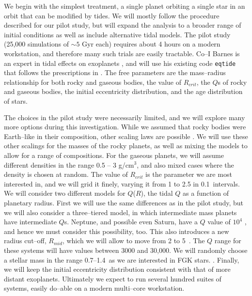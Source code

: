 \medskip
{\centerline{}}
\smallskip

We begin with the simplest treatment, a single planet orbiting a
single star in an orbit that can be modified by tides.  We will mostly
follow the procedure described for our pilot study, but will expand
the analysis to a broader range of initial conditions as well as
include alternative tidal models.  The pilot study (25,000 simulations
of $\sim 5$ Gyr each) requires about 4 hours on a modern workstation,
and therefore many such trials are easily tractable.  Co--I Barnes is
an expert in tidal effects on exoplanets
\citep{Barnes08,Jackson08,Barnes09,Barnes13}, and will use his
existing code \texttt{eqtide} that follows the prescriptions in
\cite{Barnes13}.  The free parameters are the mass--radius
relationship for both rocky and gaseous bodies, the value of
$R_{crit}$, the $Q$s of rocky and gaseous bodies, the initial
eccentricity distribution, and the age distribution of \kepler stars.

The choices in the pilot study were necessarily limited, and we will
explore many more options during this investigation.  While we assumed that
rocky bodies were Earth--like in their composition, other scaling laws
are possible \citep[e.g.][]{Seager07,Fortney07,Lissauer11}.  We will
use these other scalings for the masses of the rocky planets, as well
as mixing the models to allow for a range of compositions.  For the
gaseous planets, we will assume different densities in the range 0.5
-- 3 g/cm$^3$, and also mixed cases where the density is chosen at
random.  The value of $R_{crit}$ is the parameter we are most
interested in, and we will grid it finely, varying it from 1 to 2.5
\rearth in 0.1~\rearth intervals.  We will consider two different
models for $Q$($R$), the tidal $Q$ as a function of planetary radius.
First we will use the same differences as in the pilot study, but we
will also consider a three--tiered model, in which intermediate mass
planets have intermediate $Q$s.  Neptune, and possible even Saturn,
have a $Q$ value of $10^4$ \citep{ZhangHamliton08,Lainey12}, and hence
we must consider this possibility, too.  This also introduces a new
radius cut--off, $R_{mid}$, which we will allow to move from 2 to
5~\rearth.  The $Q$ range for these systems will have values between
3000 and 30,000.  We will randomly choose a stellar mass in the range
0.7--1.4~\msun as we are interested in FGK stars.  . Finally, we will keep the initial eccentricity
distribution consistent with that of more distant exoplanets.
Ultimately we expect to run several hundred suites of systems, easily
do--able on a modern multi--core workstation.

